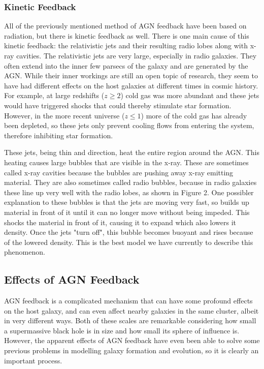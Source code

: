 \documentclass[12pt]{article}
\begin{document}
    \subsubsection{Kinetic Feedback}
    All of the previously mentioned method of AGN feedback have been based on
    radiation, but there is kinetic feedback as well.  There is one main cause
    of this kinetic feedback: the relativistic jets and their resulting
    radio lobes along
    with x-ray cavities.  The relativistic jets are very large,
    especially in radio galaxies.  They often extend into the inner few parsecs
    of the galaxy and are generated by the AGN.  While their inner workings are
    still an open topic of research, they seem to have had different effects on
    the host galaxies at different times in cosmic history.  For example, at
    large redshifts ($z \ge 2$) cold gas was more abundant and these jets would
    have triggered shocks that could thereby stimulate star formation.  However,
    in the more recent universe ($z \le 1$) more of the cold gas has already
    been depleted, so these jets only prevent cooling flows from entering the
    system, therefore inhibiting star formation.

    These jets, being thin and direction, heat the entire region around the AGN.
    This heating causes large bubbles that are visible in the x-ray.  These are
    sometimes called x-ray cavities because the bubbles are pushing away x-ray
    emitting material.  They are also sometimes called radio bubbles, because in
    radio galaxies these line up very well with the radio lobes, as shown in
    Figure 2.  One possibler explanation to these bubbles is that the jets are
    moving very fast, so builds up material in front of it until it can no
    longer move without being impeded.  This shocks the material in front of
    it, causing it to expand which also lowers it density.  Once the jets "turn
    off", this bubble becomes buoyant and rises because of the lowered density.
    This is the best model we have currently to describe this phenomenon.

\subsection{Effects of AGN Feedback}
AGN feedback is a complicated mechanism that can have some profound effects on
the host galaxy, and can even affect nearby galaxies in the same cluster, albeit
in very different ways.  Both of these scales are remarkable considering how
small a supermassive black hole is in size and how small its sphere of influence
is.  However, the apparent effects of AGN feedback have even been able to solve
some previous problems in modelling galaxy formation and evolution, so it is
clearly an important process.
\end{document}
